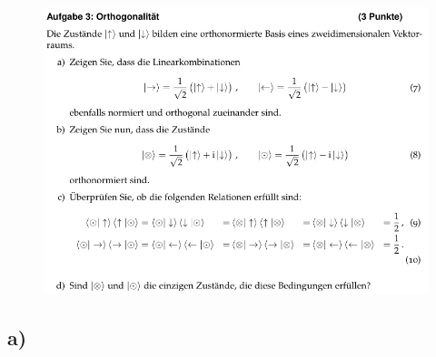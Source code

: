    \begin{figure}[H]
        \centering
        \includegraphics[width=\textwidth]{images/Aufgabe3.jpg}
        \label{fig:4}
    \end{figure}

    \subsection{a)}


